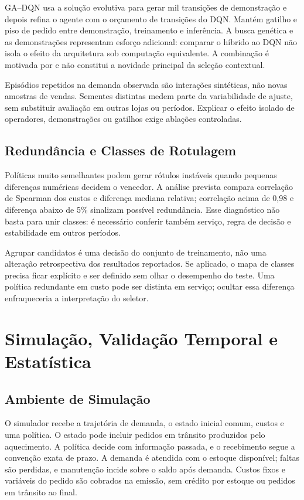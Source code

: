 GA--DQN usa a solução evolutiva para gerar mil transições de demonstração e depois refina o agente com o orçamento de transições do DQN. Mantém gatilho e piso de pedido entre demonstração, treinamento e inferência. A busca genética e as demonstrações representam esforço adicional: comparar o híbrido ao DQN não isola o efeito da arquitetura sob computação equivalente. A combinação é motivada por \citet{Zabraoui2025GaDQN} e não constitui a novidade principal da seleção contextual.

Episódios repetidos na demanda observada são interações sintéticas, não novas amostras de vendas. Sementes distintas medem parte da variabilidade de ajuste, sem substituir avaliação em outras lojas ou períodos. Explicar o efeito isolado de operadores, demonstrações ou gatilhos exige ablações controladas.

\subsection{Redundância e Classes de Rotulagem}
\label{sec:redundancia_portfolio}

Políticas muito semelhantes podem gerar rótulos instáveis quando pequenas diferenças numéricas decidem o vencedor. A análise prevista compara correlação de Spearman dos custos e diferença mediana relativa; correlação acima de 0,98 e diferença abaixo de 5\% sinalizam possível redundância. Esse diagnóstico não basta para unir classes: é necessário conferir também serviço, regra de decisão e estabilidade em outros períodos.

Agrupar candidatos é uma decisão do conjunto de treinamento, não uma alteração retrospectiva dos resultados reportados. Se aplicado, o mapa de classes precisa ficar explícito e ser definido sem olhar o desempenho do teste. Uma política redundante em custo pode ser distinta em serviço; ocultar essa diferença enfraqueceria a interpretação do seletor.

\section{Simulação, Validação Temporal e Estatística}
\label{sec:simulacao_benchmark}
\subsection{Ambiente de Simulação}
\label{sec:ambiente_simulacao}

O simulador recebe a trajetória de demanda, o estado inicial comum, custos e uma política. O estado pode incluir pedidos em trânsito produzidos pelo aquecimento. A política decide com informação passada, e o recebimento segue a convenção exata de prazo. A demanda é atendida com o estoque disponível; faltas são perdidas, e manutenção incide sobre o saldo após demanda. Custos fixos e variáveis do pedido são cobrados na emissão, sem crédito por estoque ou pedidos em trânsito ao final.

